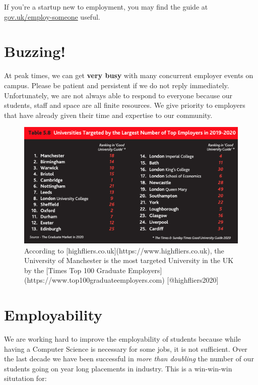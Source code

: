 \documentclass[
  12pt,
]{book}
\begin{document}
If you're a startup new to employment, you may find the guide at \href{https://www.gov.uk/employ-someone}{gov.uk/employ-someone} useful.

\hypertarget{buzzing}{%
\section{Buzzing!}\label{buzzing}}

At peak times, we can get \textbf{very busy} with many concurrent employer events on campus. \citep{highfliers2020} Please be patient and persistent if we do not reply immediately. Unfortunately, we are not always able to respond to everyone because our students, staff and space are all finite resources. We give priority to employers that have already given their time and expertise to our community.

\begin{figure}

{\centering \includegraphics[width=1\linewidth]{images/high-fliers-table} 

}

\caption{According to [highfliers.co.uk](https://www.highfliers.co.uk), the University of Manchester is the most targeted University in the UK by the [Times Top 100 Graduate Employers](https://www.top100graduateemployers.com) [@highfliers2020]}\label{fig:unnamed-chunk-4}
\end{figure}

\hypertarget{employability}{%
\section{Employability}\label{employability}}

We are working hard to improve the employability of students because while having a Computer Science is necessary for some jobs, it is not sufficient. \citep{unemployed, shadboltreview, fincherreview, finchergecco} Over the last decade we have been successful in \emph{more than doubling} the number of our students going on year long placements in industry. This is a win-win-win situtation for:
\end{document}
